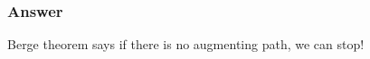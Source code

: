 \documentclass[hyperref={pdfpagelabels=false}]{beamer}
\begin{document}
\frame
{
	\frametitle{Answer}
	
	\huge{Berge theorem says if there is no augmenting path, we can stop!}
	
}

%	
%	
%			
%			
%			
%			
\end{document}
